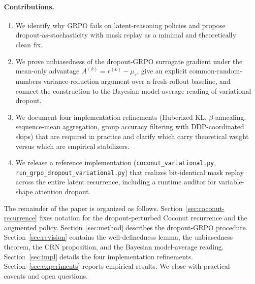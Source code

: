 \paragraph{Contributions.}
\begin{enumerate}[topsep=2pt,itemsep=2pt]
\item We identify why GRPO fails on latent-reasoning policies and
      propose dropout-as-stochasticity with mask replay as a minimal
      and theoretically clean fix.
\item We prove unbiasedness of the dropout-GRPO surrogate gradient under
      the mean-only advantage $A^{(k)} = r^{(k)} - \mu_r$, give an
      explicit common-random-numbers variance-reduction argument over a
      fresh-rollout baseline, and connect the construction to the
      Bayesian model-average reading of variational dropout.
\item We document four implementation refinements (Huberized KL,
      $\beta$-annealing, sequence-mean aggregation, group accuracy
      filtering with DDP-coordinated skips) that are required in
      practice and clarify which carry theoretical weight versus which
      are empirical stabilizers.
\item We release a reference implementation
      (\texttt{coconut\_variational.py},
      \texttt{run\_grpo\_dropout\_variational.py}) that realizes
      bit-identical mask replay across the entire latent recurrence,
      including a runtime auditor for variable-shape attention dropout.
\end{enumerate}

The remainder of the paper is organized as follows.
Section~\ref{sec:coconut-recurrence} fixes notation for the
dropout-perturbed Coconut recurrence and the augmented policy.
Section~\ref{sec:method} describes the dropout-GRPO procedure.
Section~\ref{sec:revision} contains the well-definedness lemma, the
unbiasedness theorem, the CRN proposition, and the Bayesian
model-average reading.  Section~\ref{sec:impl} details the four
implementation refinements.  Section~\ref{sec:experiments} reports
empirical results.  We close with practical caveats and open
questions.
